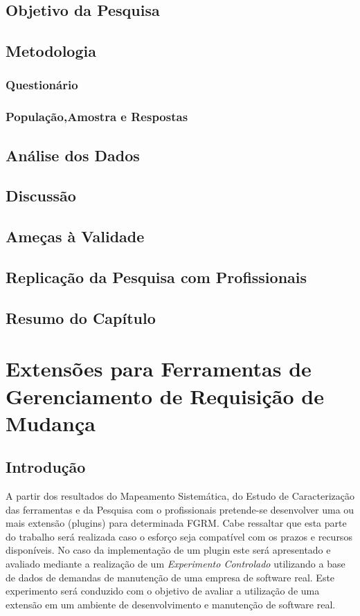 \documentclass[msc]{ppgccufmg} %
\begin{document}
\section{Objetivo da Pesquisa}

\section{Metodologia}


\subsection{Questionário}

\subsection{População,Amostra e Respostas}

\section{Análise dos Dados}

\section{Discussão}

\section{Ameças à Validade}

\section{Replicação da Pesquisa com Profissionais}

\section{Resumo do Capítulo}

\chapter{Extensões para Ferramentas de Gerenciamento de Requisição de Mudança}
\label{ch:extensoes}

\section{Introdução}
A partir dos resultados do Mapeamento Sistemática, do Estudo de Caracterização das ferramentas e da Pesquisa com o profissionais pretende-se desenvolver uma ou mais extensão (plugins) para determinada FGRM. Cabe ressaltar que esta parte do trabalho será realizada caso o esforço seja compatível com os prazos e recursos disponíveis. No caso da implementação de um plugin este será apresentado e avaliado mediante a realização de um \textit{Experimento Controlado} \cite{wohlin2012experimentation} utilizando a base de dados de demandas de manutenção de uma empresa de software real. Este experimento será conduzido com o objetivo de avaliar a utilização de uma extensão em um ambiente de desenvolvimento e manutenção de software real.
\end{document}
